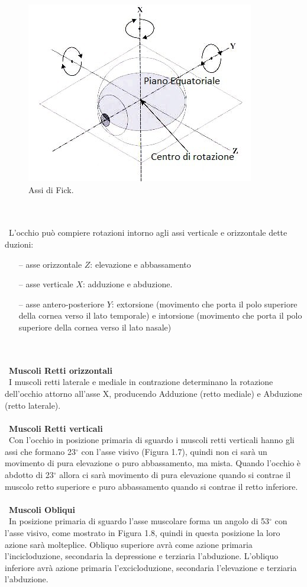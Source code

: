 \begin{figure}[h!]
	\centering
	\includegraphics[scale=0.49]{source/immagini/Assi.jpg}
	\caption[Assi di Fick]{Assi di Fick.}
	\label{fig:test7}
\end{figure}
\\\  \\\
L’occhio può compiere rotazioni intorno agli assi verticale e orizzontale dette duzioni:
 \begin{itemize}
 \itemsep-0.7em 
 \item[--]asse orizzontale $Z$: elevazione e abbassamento
 \item[--]asse verticale $X$: adduzione e abduzione.
 \item[--]asse antero-posteriore $Y$: extorsione (movimento che porta il polo superiore della cornea verso il lato temporale) e intorsione (movimento che porta il polo superiore della cornea verso il lato nasale)
 \end{itemize}
\\\ \\\
\textbf{Muscoli Retti orizzontali}
\\\
I muscoli retti laterale e mediale in contrazione determinano la rotazione dell’occhio attorno all’asse X, producendo Adduzione (retto mediale) e Abduzione (retto laterale).
\\\ \\\	
\textbf{Muscoli Retti verticali}
\\\
Con l’occhio in posizione primaria di sguardo i muscoli retti verticali hanno gli assi che formano 23$^{\circ}$ con l’asse visivo (Figura 1.7), quindi non ci sarà un movimento di pura elevazione o puro abbassamento, ma mista. Quando l’occhio è abdotto di 23$^{\circ}$ allora ci sarà movimento di pura elevazione quando si contrae il muscolo retto superiore e puro abbassamento quando si contrae il retto inferiore.
\\\ \\\
\textbf{Muscoli Obliqui}
\\\ 
In posizione primaria di sguardo l’asse muscolare forma un angolo di 53$^{\circ}$ con l’asse visivo, come mostrato in Figura 1.8, quindi in questa posizione la loro azione sarà molteplice. Obliquo superiore avrà come azione primaria l’incicloduzione, secondaria la depressione e terziaria l’abduzione. L’obliquo inferiore avrà azione primaria l’excicloduzione, secondaria l’elevazione e terziaria l’abduzione. 


